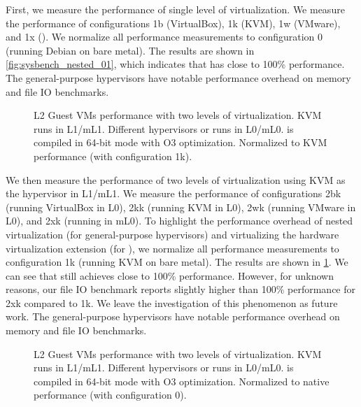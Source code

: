 First, we measure the performance of single level of virtualization. We measure the performance of configurations 1b (VirtualBox), 1k (KVM), 1w (VMware), and 1x (). We normalize all performance measurements to configuration 0 (running Debian on bare metal). The results are shown in \ref{fig:sysbench_nested_01}, which indicates that  has close to 100\% performance. The general-purpose hypervisors have notable performance overhead on memory and file IO benchmarks.

\begin{figure}[tbp]
	\begin{center}
	
	\end{center}
	\caption[L2 Guest VMs performance with two levels of virtualization, normalized to KVM performance.]{L2 Guest VMs performance with two levels of virtualization. KVM runs in L1/mL1. Different hypervisors or  runs in L0/mL0.  is compiled in 64-bit mode with O3 optimization. Normalized to KVM performance (with configuration 1k).}
	\label{fig:sysbench_nested_12}
\end{figure}

We then measure the performance of two levels of virtualization using KVM as the hypervisor in L1/mL1. We measure the performance of configurations 2bk (running VirtualBox in L0), 2kk (running KVM in L0), 2wk (running VMware in L0), and 2xk (running  in mL0). To highlight the performance overhead of nested virtualization (for general-purpose hypervisors) and virtualizing the hardware virtualization extension (for ), we normalize all performance measurements to configuration 1k (running KVM on bare metal). The results are shown in \ref{fig:sysbench_nested_12}. We can see that  still achieves close to 100\% performance. However, for unknown reasons, our file IO benchmark reports slightly higher than 100\% performance for 2xk compared to 1k. We leave the investigation of this phenomenon as future work. The general-purpose hypervisors have notable performance overhead on memory and file IO benchmarks.

\begin{figure}[tbp]
	\begin{center}
	
	\end{center}
	\caption[L2 Guest VMs performance with two levels of virtualization, normalized to native performance.]{L2 Guest VMs performance with two levels of virtualization. KVM runs in L1/mL1. Different hypervisors or  runs in L0/mL0.  is compiled in 64-bit mode with O3 optimization. Normalized to native performance (with configuration 0).}
	\label{fig:sysbench_nested_02}
\end{figure}

